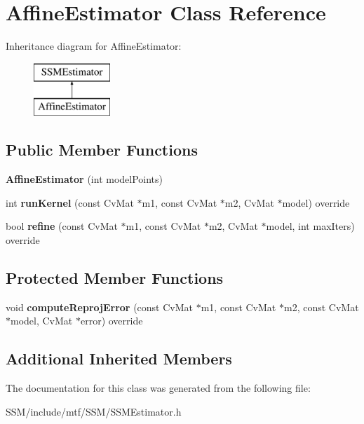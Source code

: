 \hypertarget{classAffineEstimator}{\section{Affine\-Estimator Class Reference}
\label{classAffineEstimator}
}
Inheritance diagram for Affine\-Estimator\-:\begin{figure}[H]
\begin{center}
\leavevmode
\includegraphics[height=2.000000cm]{classAffineEstimator}
\end{center}
\end{figure}
\subsection*{Public Member Functions}
\begin{DoxyCompactItemize}
\item 
\hypertarget{classAffineEstimator_ac19ac61c0ef244dcbdb6b33a61228389}{{\bfseries Affine\-Estimator} (int model\-Points)}\label{classAffineEstimator_ac19ac61c0ef244dcbdb6b33a61228389}

\item 
\hypertarget{classAffineEstimator_aebc1eec833f3c3cfb64191761aee8144}{int {\bfseries run\-Kernel} (const Cv\-Mat $\ast$m1, const Cv\-Mat $\ast$m2, Cv\-Mat $\ast$model) override}\label{classAffineEstimator_aebc1eec833f3c3cfb64191761aee8144}

\item 
\hypertarget{classAffineEstimator_a94e88dde72d03a9f5fd10ea9858e1869}{bool {\bfseries refine} (const Cv\-Mat $\ast$m1, const Cv\-Mat $\ast$m2, Cv\-Mat $\ast$model, int max\-Iters) override}\label{classAffineEstimator_a94e88dde72d03a9f5fd10ea9858e1869}

\end{DoxyCompactItemize}
\subsection*{Protected Member Functions}
\begin{DoxyCompactItemize}
\item 
\hypertarget{classAffineEstimator_a796eb2c1999a2fb599989fcfee5a455d}{void {\bfseries compute\-Reproj\-Error} (const Cv\-Mat $\ast$m1, const Cv\-Mat $\ast$m2, const Cv\-Mat $\ast$model, Cv\-Mat $\ast$error) override}\label{classAffineEstimator_a796eb2c1999a2fb599989fcfee5a455d}

\end{DoxyCompactItemize}
\subsection*{Additional Inherited Members}


The documentation for this class was generated from the following file\-:\begin{DoxyCompactItemize}
\item 
S\-S\-M/include/mtf/\-S\-S\-M/S\-S\-M\-Estimator.\-h\end{DoxyCompactItemize}
